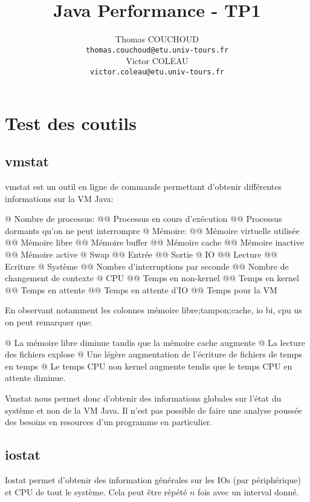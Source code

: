 \documentclass{report}
\title{Java Performance - TP1}
\author{Thomas COUCHOUD\\\texttt{thomas.couchoud@etu.univ-tours.fr}\\Victor COLEAU\\\texttt{victor.coleau@etu.univ-tours.fr}}
\begin{document}
	\mccTitle
	
	\chapter{Test des coutils}
		\section{vmstat}
			vmstat est un outil en ligne de commande permettant d'obtenir différentes informations sur la VM Java:
			\begin{easylist}[itemize]
				@ Nombre de processus:
				@@ Processus en cours d'exécution
				@@ Processus dormants qu'on ne peut interrompre
				@ Mémoire:
				@@ Mémoire virtuelle utilisée
				@@ Mémoire libre
				@@ Mémoire buffer
				@@ Mémoire cache
				@@ Mémoire inactive
				@@ Mémoire active
				@ Swap
				@@ Entrée
				@@ Sortie
				@ IO
				@@ Lecture
				@@ Ecriture
				@ Système
				@@ Nombre d'interruptions par seconde
				@@ Nombre de changement de contexte
				@ CPU
				@@ Temps en non-kernel
				@@ Temps en kernel
				@@ Temps en attente
				@@ Temps en attente d'IO
				@@ Temps pour la VM
			\end{easylist}
			
			
			En observant notamment les colonnes mémoire libre;tampon;cache, io bi, cpu us on peut remarquer que:
			\begin{easylist}[itemize]
				@ La mémoire libre diminue tandis que la mémoire cache augmente
				@ La lecture des fichiers explose
				@ Une légère augmentation de l'écriture de fichiers de temps en temps
				@ Le temps CPU non kernel augmente tendis que le temps CPU en attente diminue.	
			\end{easylist}

			Vmstat nous permet donc d'obtenir des informations globales sur l'état du système et non de la VM Java.
			Il n'est pas possible de faire une analyse poussée des besoins en resources d'un programme en particulier.		
				
		\section{iostat}
			Iostat permet d'obtenir des information générales sur les IOs (par périphérique) et CPU de tout le système.
			Cela peut être répété $n$ fois avec un interval donné.
			
			
\end{document}

